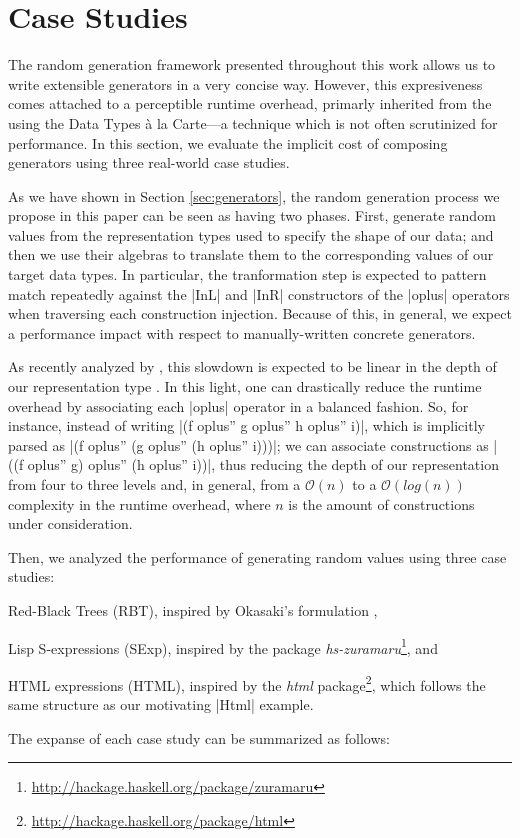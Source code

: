 \section{Case Studies}
\label{sec:casestudies}

The random generation framework presented throughout this work allows us to
write extensible generators in a very concise way.
%
However, this expresiveness comes attached to a perceptible runtime overhead,
primarly inherited from the using the Data Types \`a la Carte---a technique
which is not often scrutinized for performance.
%
In this section, we evaluate the implicit cost of composing generators using
three real-world case studies.


As we have shown in Section \ref{sec:generators}, the random generation
process we propose in this paper can be seen as having two phases.
%
First, generate random values from the representation types used to specify the
shape of our data; and then we use their algebras to translate them to the
corresponding values of our target data types.
%
In particular, the tranformation step is expected to pattern match repeatedly
against the |InL| and |InR| constructors of the |oplus| operators when
traversing each construction injection.
%
Because of this, in general, we expect a performance impact with respect to
manually-written concrete generators.


As recently analyzed by \citeauthor{KiriyamaOptimizingDTC}, this slowdown is
expected to be linear in the depth of our representation type
\cite{KiriyamaOptimizingDTC}.
%
In this light, one can drastically reduce the runtime overhead by associating
each |oplus| operator in a balanced fashion.
%
So, for instance, instead of writing |(f oplus'' g oplus'' h oplus'' i)|, which
is implicitly parsed as |(f oplus'' (g oplus'' (h oplus'' i)))|; we can
associate constructions as |((f oplus'' g) oplus'' (h oplus'' i))|, thus
reducing the depth of our representation from four to three levels and, in
general, from a $\mathcal{O}(n)$ to a $\mathcal{O}(log(n))$ complexity in the
runtime overhead, where $n$ is the amount of constructions under consideration.


Then, we analyzed the performance of generating random values using three case
studies:
%
\begin{inparaenum}[(i)]
\item Red-Black Trees (RBT), inspired by Okasaki's formulation
  \cite{okasaki1999red},
\item Lisp S-expressions (SExp), inspired by the package
  \emph{hs-zuramaru}\footnote{\url{http://hackage.haskell.org/package/zuramaru}},
  and
\item HTML expressions (HTML), inspired by the \emph{html}
  package\footnote{\url{http://hackage.haskell.org/package/html}}, which follows
  the same structure as our motivating |Html| example.
\end{inparaenum}
%
The expanse of each case study can be summarized as follows:


